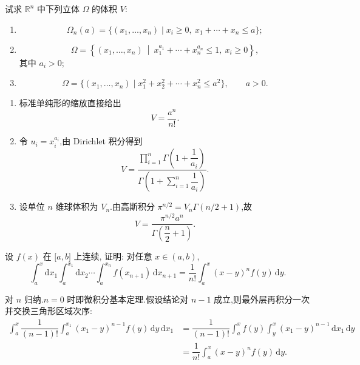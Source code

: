 \begin{example}
    试求 $\mathbb{R}^n$ 中下列立体 $\Omega$ 的体积 $V$:
    \begin{enumerate}
        \item
              \[
                  \Omega_n(a)=\{(x_1,\ldots,x_n)\mid x_i\geq0,\ x_1+\cdots+x_n\leq a\};
              \]
        \item
              \[
                  \Omega=\left\{(x_1,\ldots,x_n)\ \middle|\ x_1^{a_1}+\cdots+x_n^{a_n}\leq1,\ x_i\geq0\right\},
              \]
              其中 $a_i>0$;
        \item
              \[
                  \Omega=\{(x_1,\ldots,x_n)\mid x_1^2+x_2^2+\cdots+x_n^2\leq a^2\},\qquad a>0.
              \]
    \end{enumerate}
\end{example}
\exampleblank

\begin{solution}
    \leavevmode
    \begin{enumerate}
        \item 标准单纯形的缩放直接给出
              \[
                  V=\dfrac{a^n}{n!}.
              \]
        \item 令 $u_i=x_i^{a_i}$,由 Dirichlet 积分得到
              \[
                  V=\dfrac{\displaystyle\prod_{i=1}^n\Gamma\left(1+\dfrac{1}{a_i}\right)}
                  {\displaystyle\Gamma\left(1+\sum_{i=1}^n\dfrac{1}{a_i}\right)}.
              \]
        \item 设单位 $n$ 维球体积为 $V_n$.由高斯积分 $\pi^{n/2}=V_n\Gamma(n/2+1)$,故
              \[
                  V=\dfrac{\pi^{n/2}a^n}{\Gamma\left(\dfrac{n}{2}+1\right)}.
              \]
    \end{enumerate}
\end{solution}

\begin{example}
    设 $f(x)$ 在 $\lbrack a,b\rbrack$ 上连续, 证明: 对任意 $x\in(a,b)$,
    \[
        \displaystyle\int_a^x\mathrm{d}x_1\int_a^{x_1}\mathrm{d}x_2\cdots\int_a^{x_n}f(x_{n+1})\,\mathrm{d}x_{n+1}
        =\dfrac{1}{n!}\int_a^x(x-y)^nf(y)\,\mathrm{d}y.
    \]
\end{example}
\exampleblank

\begin{solution}
    对 $n$ 归纳.$n=0$ 时即微积分基本定理.假设结论对 $n-1$ 成立,则最外层再积分一次并交换三角形区域次序:
    \[
        \begin{aligned}
            \int_a^x\dfrac{1}{(n-1)!}\int_a^{x_1}(x_1-y)^{n-1}f(y)\,\mathrm{d}y\,\mathrm{d}x_1
             & =\dfrac{1}{(n-1)!}\int_a^xf(y)\int_y^x(x_1-y)^{n-1}\,\mathrm{d}x_1\,\mathrm{d}y \\
             & =\dfrac{1}{n!}\int_a^x(x-y)^nf(y)\,\mathrm{d}y.
        \end{aligned}
    \]
\end{solution}

